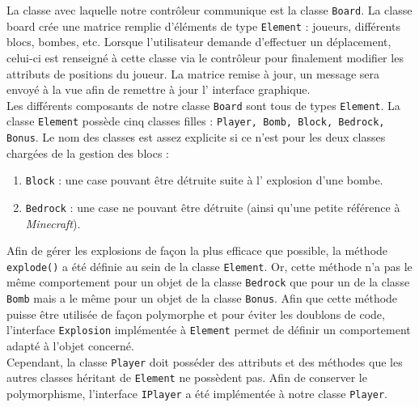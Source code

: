         La classe avec laquelle notre contrôleur communique est la classe 
        \texttt{Board}. La classe board crée une matrice remplie d'éléments 
        de type \texttt{Element} : joueurs, différents blocs, bombes, etc. 
        Lorsque l'utilisateur demande d'effectuer un déplacement, celui-ci 
        est renseigné à cette classe via le contr\^oleur pour finalement 
        modifier les attributs de positions du joueur. La matrice remise à 
        jour, un message sera envoyé à la vue afin de remettre à jour l'
        interface graphique.\\
        
        Les différents composants de notre classe \texttt{Board} sont tous 
        de types \texttt{Element}. La classe \texttt{Element} possède cinq 
        classes filles : \texttt{Player, Bomb, Block, Bedrock, Bonus}. Le 
        nom des classes est assez explicite si ce n'est pour les deux classes 
        chargées de la gestion des blocs :
        \begin{enumerate}
        \item \texttt{Block} : une case pouvant \^etre détruite suite à l'
        explosion d'une bombe.
        \item \texttt{Bedrock} : une case ne pouvant \^etre détruite (ainsi 
        qu'une petite référence à \textit{Minecraft}).
        \end{enumerate}
        
        Afin de gérer les explosions de façon la plus efficace que possible, 
        la méthode \texttt{explode()} a été définie au sein de la classe 
        \texttt{Element}. Or, cette méthode n'a pas le même comportement pour
        un objet de la classe \texttt{Bedrock} que pour un de la classe \texttt{Bomb} mais a le m\^eme pour un objet de la classe \texttt{Bonus}. 
        Afin que cette méthode puisse être utilisée de façon polymorphe et pour
        éviter les doublons de code, l'interface \texttt{Explosion} implémentée 
        à \texttt{Element} permet de définir un comportement adapté à l'objet
        concerné.\\
        
		Cependant, la classe \texttt{Player} doit posséder des attributs et 
		des méthodes que les autres classes héritant de \texttt{Element} ne 
		possèdent pas. Afin de conserver le polymorphisme, l'interface 
		\texttt{IPlayer} a été implémentée à notre classe \texttt{Player}.
        
